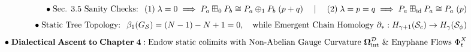 \documentclass[preview]{standalone}
\begin{document}
\begin{align*}
\special{dvisvgm:raw <g id='unique000'>}\bullet\;\text{Sec. 3.5 Sanity Checks: }\; (1)\;\lambda=0 \implies P_a\boxplus_0 P_b \cong P_a\oplus_1 P_b\;(p+q) \quad\mid\quad (2)\;\lambda=p=q \implies P_a\boxplus_{\text{id}} P_a \cong P_a\;(p)\\[4pt]\bullet\;\text{Static Tree Topology: }\;\beta_1(G_{\mathcal{S}}) = (N-1) - N + 1 = 0, \quad \text{while Emergent Chain Homology } \partial_*: H_{\gamma+1}(\mathcal{S}_c)\to H_\gamma(\mathcal{S}_\phi)\\[4pt]\bullet\;\mathbf{Dialectical\;Ascent\;to\;Chapter\;4:}\;\text{Endow static colimits with Non-Abelian Gauge Curvature }\mathbf{\Omega}_{\text{int}}^{\mathcal{D}}\text{ \& Enyphane Flows }\Phi_t^X\special{dvisvgm:raw </g>}
\end{align*}
\end{document}

